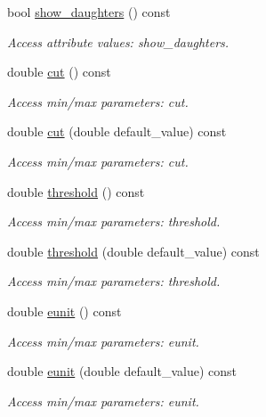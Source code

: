 \begin{DoxyCompactItemize}
bool \hyperlink{struct_d_d4hep_1_1_x_m_l_1_1_dimension_a1a86368775d21b14a7e6578e032400c7}{show\+\_\+daughters} () const
\begin{DoxyCompactList}\small\item\em Access attribute values\+: show\+\_\+daughters. \end{DoxyCompactList}\item 
double \hyperlink{struct_d_d4hep_1_1_x_m_l_1_1_dimension_a94b990b30f0e5260bd52acc1e110cc04}{cut} () const
\begin{DoxyCompactList}\small\item\em Access min/max parameters\+: cut. \end{DoxyCompactList}\item 
double \hyperlink{struct_d_d4hep_1_1_x_m_l_1_1_dimension_a683f6534840435ecabf52f74f05700cd}{cut} (double default\+\_\+value) const
\begin{DoxyCompactList}\small\item\em Access min/max parameters\+: cut. \end{DoxyCompactList}\item 
double \hyperlink{struct_d_d4hep_1_1_x_m_l_1_1_dimension_aad2e7e171293d51825bb758dc80da6bc}{threshold} () const
\begin{DoxyCompactList}\small\item\em Access min/max parameters\+: threshold. \end{DoxyCompactList}\item 
double \hyperlink{struct_d_d4hep_1_1_x_m_l_1_1_dimension_a80839185976256eeb128fd101e1dd285}{threshold} (double default\+\_\+value) const
\begin{DoxyCompactList}\small\item\em Access min/max parameters\+: threshold. \end{DoxyCompactList}\item 
double \hyperlink{struct_d_d4hep_1_1_x_m_l_1_1_dimension_a29cc95940643b5890265b41487c05905}{eunit} () const
\begin{DoxyCompactList}\small\item\em Access min/max parameters\+: eunit. \end{DoxyCompactList}\item 
double \hyperlink{struct_d_d4hep_1_1_x_m_l_1_1_dimension_a4d44ba95a7d22dde526cff35d12a607e}{eunit} (double default\+\_\+value) const
\begin{DoxyCompactList}\small\item\em Access min/max parameters\+: eunit. \end{DoxyCompactList}\item 

\end{DoxyCompactItemize}
